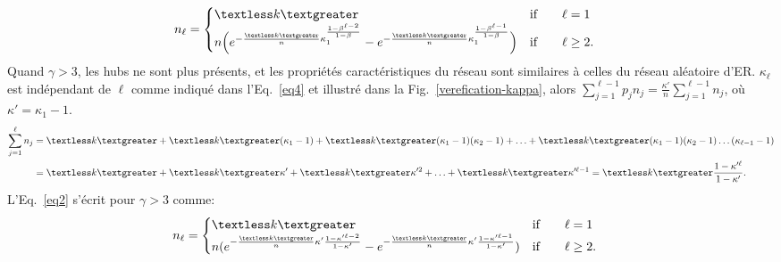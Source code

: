 \begin{align}
n_{\ell} &=
\begin{cases}
\km & \text{if}\qquad \ell=1 \\
n\Big(e^{-\frac{\km}{n}\kappa_1^{\frac{1-\beta^{\ell-2}}{1-\beta}}}-e^{-\frac{\km}{n}\kappa_1^{\frac{1-\beta^{\ell-1}}{1-\beta}}}\Big) & \text{if}\qquad \ell \ge 2.
\end{cases}
\label{eq8}
\end{align}
Quand $\gamma> 3 $, les hubs ne sont plus présents, et les propriétés caractéristiques du réseau sont similaires à celles du réseau aléatoire d'ER.
 $\kappa_{\ell}$ est indépendant de $\ell$ comme indiqué dans l'Eq.~\eqref{eq4} et illustré dans la Fig.~\ref{verefication-kappa}, 
alors $\sum_{j=1}^{\ell-1}p_j n_j=\frac{\kappa'}{n}\sum_{j=1}^{\ell-1}n_j$, où $\kappa'=\kappa_1-1$.  
\begin{align}
\sum_{j=1}^{\ell}n_j &=\km+\km(\kappa_1-1)+\km(\kappa_1-1)(\kappa_2-1)+\ldots+\km(\kappa_1-1)(\kappa_2-1)\ldots(\kappa_{\ell-1}-1) \nonumber\\
&=\km+\km\kappa'+\km\kappa'^2+\ldots+\km\kappa'^{\ell-1}=\km\frac{1-\kappa'^{\ell}}{1-\kappa'}. 
\label{eq9}
\end{align}
L'Eq.~\eqref{eq2} s'écrit pour $\gamma>3$ comme:
\begin{align}
n_{\ell} &=
\begin{cases}
\textless k \textgreater & \text{if}\qquad \ell=1 \\
n(e^{-\frac{\textless k \textgreater}{n}\kappa'\frac{1-\kappa'^{\ell-2}}{1-\kappa'}}-e^{-\frac{\km}{n}\kappa'\frac{1-\kappa'^{\ell-1}}{1-\kappa'}}) & \text{if}\qquad \ell \ge 2.
\end{cases}
\label{eq10}
\end{align}
